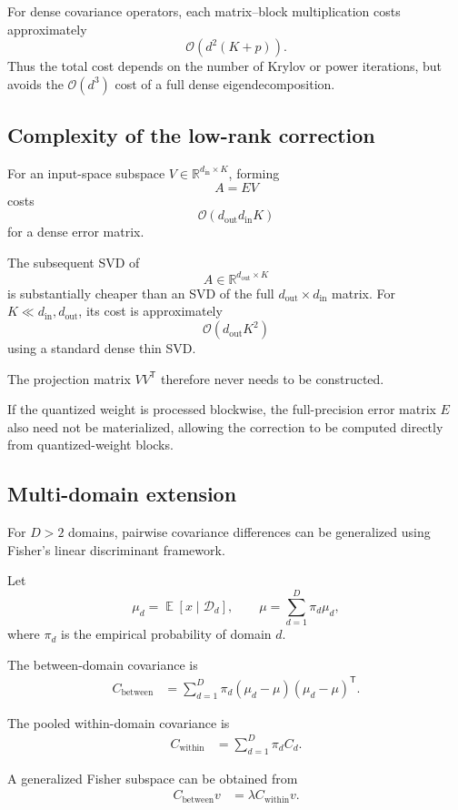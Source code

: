 \documentclass[11pt,a4paper]{article}
\DeclareMathOperator{\E}{\mathbb{E}}
\begin{document}
For dense covariance operators, each matrix--block multiplication
costs approximately
\[
\mathcal{O}(d^2(K+p)).
\]
Thus the total cost depends on the number of Krylov or power iterations,
but avoids the $\mathcal{O}(d^3)$ cost of a full dense
eigendecomposition.

\subsection{Complexity of the low-rank correction}

For an input-space subspace $V\in\mathbb{R}^{d_{\mathrm{in}}\times K}$,
forming
\[
A=EV
\]
costs
\[
\mathcal{O}(d_{\mathrm{out}}d_{\mathrm{in}}K)
\]
for a dense error matrix.

The subsequent SVD of
\[
A\in\mathbb{R}^{d_{\mathrm{out}}\times K}
\]
is substantially cheaper than an SVD of the full
$d_{\mathrm{out}}\times d_{\mathrm{in}}$ matrix. For
$K\ll d_{\mathrm{in}},d_{\mathrm{out}}$, its cost is approximately
\[
\mathcal{O}(d_{\mathrm{out}}K^2)
\]
using a standard dense thin SVD.

The projection matrix $VV^{\mathsf T}$ therefore never needs to be
constructed.

If the quantized weight is processed blockwise, the full-precision
error matrix $E$ also need not be materialized, allowing the correction
to be computed directly from quantized-weight blocks.

\subsection{Multi-domain extension}

For $D>2$ domains, pairwise covariance differences can be generalized
using Fisher's linear discriminant framework.

Let
\[
\mu_d
=
\E[x\mid\mathcal{D}_d],
\qquad
\mu
=
\sum_{d=1}^D\pi_d\mu_d,
\]
where $\pi_d$ is the empirical probability of domain $d$.

The between-domain covariance is
\begin{align}
C_{\mathrm{between}}
&=
\sum_{d=1}^D
\pi_d
(\mu_d-\mu)(\mu_d-\mu)^{\mathsf T}.
\end{align}

The pooled within-domain covariance is
\begin{align}
C_{\mathrm{within}}
&=
\sum_{d=1}^D
\pi_d C_d.
\end{align}

A generalized Fisher subspace can be obtained from
\begin{align}
C_{\mathrm{between}}v
&=
\lambda
C_{\mathrm{within}}v.
\end{align}
\end{document}
